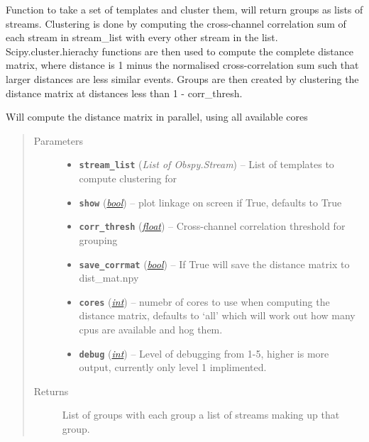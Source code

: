 \documentclass[a4paper,10pt,english]{sphinxmanual}
\begin{document}
\begin{fulllineitems}
\label{submodules/utils.clustering:clustering.cluster}
Function to take a set of templates and cluster them, will return groups as
lists of streams.  Clustering is done by computing the cross-channel
correlation sum of each stream in stream\_list with every other stream in
the list.  Scipy.cluster.hierachy functions are then used to compute the
complete distance matrix, where distance is 1 minus the normalised
cross-correlation sum such that larger distances are less similar events.
Groups are then created by clustering the distance matrix at distances
less than 1 - corr\_thresh.

Will compute the distance matrix in parallel, using all available cores
\begin{quote}\begin{description}
\item[{Parameters}] \leavevmode\begin{itemize}
\item {} 
\textbf{\texttt{stream\_list}} (\emph{List of Obspy.Stream}) -- List of templates to compute clustering for

\item {} 
\textbf{\texttt{show}} (\href{https://docs.python.org/library/functions.html\#bool}{\emph{bool}}) -- plot linkage on screen if True, defaults to True

\item {} 
\textbf{\texttt{corr\_thresh}} (\href{https://docs.python.org/library/functions.html\#float}{\emph{float}}) -- Cross-channel correlation threshold for grouping

\item {} 
\textbf{\texttt{save\_corrmat}} (\href{https://docs.python.org/library/functions.html\#bool}{\emph{bool}}) -- If True will save the distance matrix to dist\_mat.npy

\item {} 
\textbf{\texttt{cores}} (\href{https://docs.python.org/library/functions.html\#int}{\emph{int}}) -- numebr of cores to use when computing the distance matrix,            defaults to `all' which will work out how many cpus are available            and hog them.

\item {} 
\textbf{\texttt{debug}} (\href{https://docs.python.org/library/functions.html\#int}{\emph{int}}) -- Level of debugging from 1-5, higher is more output, currently        only level 1 implimented.

\end{itemize}

\item[{Returns}] \leavevmode
List of groups with each group a list of streams making up        that group.

\end{description}\end{quote}

\end{fulllineitems}
\end{document}

